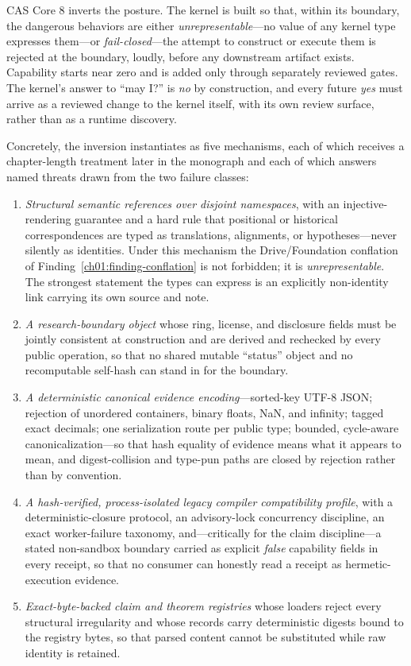 CAS Core 8 inverts the posture. The kernel is built so that, within its
boundary, the dangerous behaviors are either \emph{unrepresentable}---no
value of any kernel type expresses them---or \emph{fail-closed}---the
attempt to construct or execute them is rejected at the boundary, loudly,
before any downstream artifact exists. Capability starts near zero and is
added only through separately reviewed gates. The kernel's answer to
``may I?'' is \emph{no} by construction, and every future \emph{yes}
must arrive as a reviewed change to the kernel itself, with its own
review surface, rather than as a runtime discovery.

Concretely, the inversion instantiates as five mechanisms, each of which
receives a chapter-length treatment later in the monograph and each of
which answers named threats drawn from the two failure classes:

\begin{enumerate}
\item \emph{Structural semantic references over disjoint namespaces},
with an injective-rendering guarantee and a hard rule that positional or
historical correspondences are typed as translations, alignments, or
hypotheses---never silently as identities. Under this mechanism the
Drive/Foundation conflation of Finding~\ref{ch01:finding-conflation} is
not forbidden; it is \emph{unrepresentable}. The strongest statement the
types can express is an explicitly non-identity link carrying its own
source and note.
\item \emph{A research-boundary object} whose ring, license, and
disclosure fields must be jointly consistent at construction and are
derived and rechecked by every public operation, so that no shared
mutable ``status'' object and no recomputable self-hash can stand in for
the boundary.
\item \emph{A deterministic canonical evidence encoding}---sorted-key
UTF-8 JSON; rejection of unordered containers, binary floats, NaN, and
infinity; tagged exact decimals; one serialization route per public type;
bounded, cycle-aware canonicalization---so that hash equality of
evidence means what it appears to mean, and digest-collision and
type-pun paths are closed by rejection rather than by convention.
\item \emph{A hash-verified, process-isolated legacy compiler
compatibility profile}, with a deterministic-closure protocol, an
advisory-lock concurrency discipline, an exact worker-failure taxonomy,
and---critically for the claim discipline---a stated non-sandbox
boundary carried as explicit \emph{false} capability fields in every
receipt, so that no consumer can honestly read a receipt as
hermetic-execution evidence.
\item \emph{Exact-byte-backed claim and theorem registries} whose
loaders reject every structural irregularity and whose records carry
deterministic digests bound to the registry bytes, so that parsed
content cannot be substituted while raw identity is retained.
\end{enumerate}

